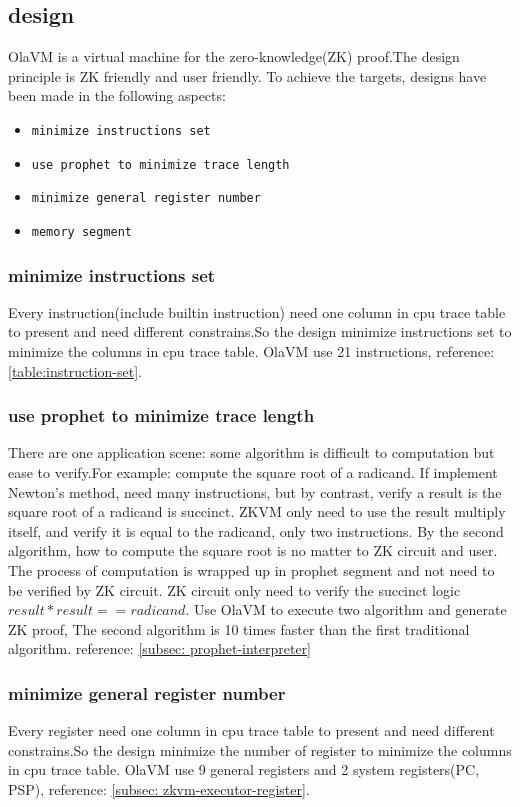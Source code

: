 \subsection{design}\label{subsec: vm-design}
OlaVM is a virtual machine for the zero-knowledge(ZK) proof.The design principle is ZK friendly and user friendly.
To achieve the targets, designs have been made in the following aspects:

\begin{itemize}
    \item \verb|minimize instructions set|
    \item \verb|use prophet to minimize trace length|
    \item \verb|minimize general register number|
    \item \verb|memory segment|
\end{itemize}

\subsubsection{minimize instructions set}
Every instruction(include builtin instruction) need one column in cpu trace table to present and need different constrains.So the design minimize instructions set to minimize the columns in cpu trace table.
OlaVM use 21 instructions, reference: \ref{table:instruction-set}.

\subsubsection{use prophet to minimize trace length}
There are one application scene: some algorithm is difficult to computation but ease to verify.For example: compute the square root of a radicand.
If implement Newton's method, need many instructions, but by contrast, verify a result is the square root of a radicand is succinct.
ZKVM only need to use the result multiply itself, and verify it is equal to the radicand, only two instructions.
By the second algorithm, how to compute the square root is no matter to ZK circuit and user.
The process of computation is wrapped up in prophet segment and not need to be verified by ZK circuit.
ZK circuit only need to verify the succinct logic $result*result == radicand$.
Use OlaVM to execute two algorithm and generate ZK proof, The second algorithm is 10 times faster than the first traditional algorithm.
reference: \ref{subsec: prophet-interpreter}

\subsubsection{minimize general register number}
Every register need one column in cpu trace table to present and need different constrains.So the design minimize the number of register to minimize the columns in cpu trace table.
OlaVM use 9 general registers and 2 system registers(PC, PSP),  reference: \ref{subsec: zkvm-executor-register}.

